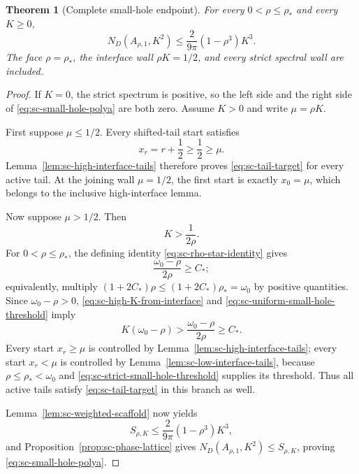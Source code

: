 \documentclass[11pt]{article}
\numberwithin{equation}{section}
\newtheorem{theorem}{Theorem}[section]
\theoremstyle{definition}
\theoremstyle{remark}
\begin{document}
\begin{theorem}[Complete small-hole endpoint]
\label{thm:sc-small-hole-endpoint}
For every \(0<\rho\le\rho_*\) and every \(K\ge0\),
\begin{equation}
  \boxed{
  N_D(A_{\rho,1},K^2)
  \le\frac{2}{9\pi}(1-\rho^3)K^3.}
  \label{eq:sc-small-hole-polya}
\end{equation}
The face \(\rho=\rho_*\), the interface wall \(\rho K=1/2\), and every
strict spectral wall are included.
\end{theorem}

\begin{proof}
If \(K=0\), the strict spectrum is positive, so the left side and the right
side of \eqref{eq:sc-small-hole-polya} are both zero.  Assume \(K>0\) and
write \(\mu=\rho K\).

First suppose \(\mu\le1/2\).  Every shifted-tail start satisfies
\[
  x_r=r+\frac12\ge\frac12\ge\mu.
\]
Lemma~\ref{lem:sc-high-interface-tails} therefore proves
\eqref{eq:sc-tail-target} for every active tail.  At the joining wall
\(\mu=1/2\), the first start is exactly \(x_0=\mu\), which belongs to the
inclusive high-interface lemma.

Now suppose \(\mu>1/2\).  Then
\begin{equation}
  K>\frac1{2\rho}.
  \label{eq:sc-high-K-from-interface}
\end{equation}
For \(0<\rho\le\rho_*\), the defining identity
\eqref{eq:sc-rho-star-identity} gives
\begin{equation}
  \frac{\omega_0-\rho}{2\rho}\ge C_*;
  \label{eq:sc-uniform-small-hole-threshold}
\end{equation}
equivalently, multiply
\((1+2C_*)\rho\le(1+2C_*)\rho_*=\omega_0\)
by positive quantities.  Since
\(\omega_0-\rho>0\), \eqref{eq:sc-high-K-from-interface} and
\eqref{eq:sc-uniform-small-hole-threshold} imply
\begin{equation}
  K(\omega_0-\rho)
  >\frac{\omega_0-\rho}{2\rho}
  \ge C_*.
  \label{eq:sc-strict-small-hole-threshold}
\end{equation}
Every start \(x_r\ge\mu\) is controlled by
Lemma~\ref{lem:sc-high-interface-tails}; every start \(x_r<\mu\) is
controlled by Lemma~\ref{lem:sc-low-interface-tails}, because
\(\rho\le\rho_*<\omega_0\) and
\eqref{eq:sc-strict-small-hole-threshold} supplies its threshold.  Thus all
active tails satisfy \eqref{eq:sc-tail-target} in this branch as well.

Lemma~\ref{lem:sc-weighted-scaffold} now yields
\[
  S_{\rho,K}\le\frac{2}{9\pi}(1-\rho^3)K^3,
\]
and Proposition~\ref{prop:sc-phase-lattice} gives
\(N_D(A_{\rho,1},K^2)\le S_{\rho,K}\), proving
\eqref{eq:sc-small-hole-polya}.


\end{proof}
\end{document}
